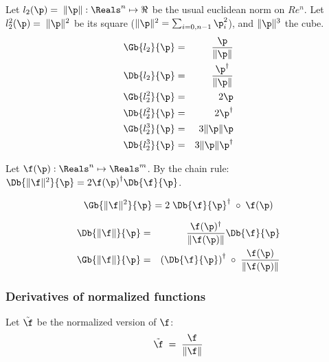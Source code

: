 Let $l_2(\p) = \; \| \p  \|: \Reals^n \mapsto \Re$ 
be the usual euclidean norm on $Re^n$.
Let $l_2^2(\p) = \; \| \p  \|^2 $
be its square
($ \| \p  \|^2  = \sum_{i=0,n-1} \p_i^2$),
and $ \| \p  \|^3$ the cube.
\begin{eqnarray}
\label{eq:l2-gradient}
\Gb{l_2}{\p} & = & {{ \p } \over { \| \p  \|}} \\
\Db{l_2}{\p} & = &{{ \p^\dagger } \over { \| \p  \|}} \nonumber \\
\Gb{l_2^2}{\p} & = & 2\p \nonumber \\ 
\Db{l_2^2}{\p} & = & 2\p^\dagger \nonumber \\
\Gb{l_2^3}{\p} & = & 3 \| \p  \| \p \nonumber \\
\Db{l_2^3}{\p} & = & 3 \| \p  \| \p^\dagger \nonumber
\end{eqnarray}

Let $\f(\p) : \Reals^n \mapsto \Reals^m$.
By the chain rule:
$\Db{\| \f \|^2}{\p}  =  2 {\f(\p)}^{\dagger} \Db{\f}{\p} $.

\begin{equation}
\Gb{\| \f \|^2}{\p}  =  2 \;\Db{\f}{\p}^\dagger \;\circ \;\f(\p)
\end{equation}

\begin{eqnarray}
\label{eq:norm_derivative}
\Db{\| \f \|}{\p}
& = &
{{\f(\p)^\dagger} \over {\| \f(\p) \|}} \Db{\f}{\p}  \\
\Gb{\| \f \|}{\p}
& = &
\left(\Db{\f}{\p}\right)^\dagger \;\circ \;{{\f(\p)} \over { \| \f(\p)  \|}}
\label{eq:norm_gradient}
\end{eqnarray}


\subsubsection{Derivatives of normalized functions}
\label{sec:Derivatives-of-normalized-functions}

Let $\tilde{\f}$ be the normalized version of $\f$:
\begin{equation}
\tilde{\f} \;= \;{{\f} \over {\| \f \|}}
\end{equation}

